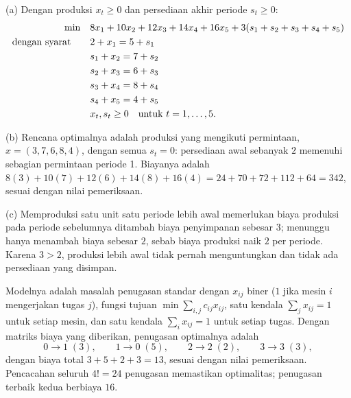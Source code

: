 
(a) Dengan produksi $x_t \geq 0$ dan persediaan akhir periode $s_t \geq 0$:
\begin{align*}
\min \quad & 8x_1 + 10x_2 + 12x_3 + 14x_4 + 16x_5 + 3(s_1 + s_2 + s_3 + s_4 + s_5)\\
\mbox{dengan syarat}\quad \quad & 2 + x_1 = 5 + s_1\\
& s_1 + x_2 = 7 + s_2\\
& s_2 + x_3 = 6 + s_3\\
& s_3 + x_4 = 8 + s_4\\
& s_4 + x_5 = 4 + s_5\\
& x_t, s_t \geq 0 \quad \mbox{untuk } t = 1, \dots, 5.
\end{align*}

(b) Rencana optimalnya adalah produksi yang mengikuti permintaan, $x = (3, 7, 6, 8, 4)$, dengan semua $s_t = 0$: persediaan awal sebanyak $2$ memenuhi sebagian permintaan periode 1. Biayanya adalah $8(3) + 10(7) + 12(6) + 14(8) + 16(4) = 24 + 70 + 72 + 112 + 64 = 342$, sesuai dengan nilai pemeriksaan.

(c) Memproduksi satu unit satu periode lebih awal memerlukan biaya produksi pada periode sebelumnya ditambah biaya penyimpanan sebesar $3$; menunggu hanya menambah biaya sebesar $2$, sebab biaya produksi naik $2$ per periode. Karena $3 > 2$, produksi lebih awal tidak pernah menguntungkan dan tidak ada persediaan yang disimpan.


Modelnya adalah masalah penugasan standar dengan $x_{ij}$ biner ($1$ jika mesin $i$ mengerjakan tugas $j$), fungsi tujuan $\min \sum_{i,j} c_{ij} x_{ij}$, satu kendala $\sum_j x_{ij} = 1$ untuk setiap mesin, dan satu kendala $\sum_i x_{ij} = 1$ untuk setiap tugas. Dengan matriks biaya yang diberikan, penugasan optimalnya adalah
\[
0 \to 1 \;(3), \qquad 1 \to 0 \;(5), \qquad 2 \to 2 \;(2), \qquad 3 \to 3 \;(3),
\]
dengan biaya total $3 + 5 + 2 + 3 = 13$, sesuai dengan nilai pemeriksaan. Pencacahan seluruh $4! = 24$ penugasan memastikan optimalitas; penugasan terbaik kedua berbiaya $16$.


